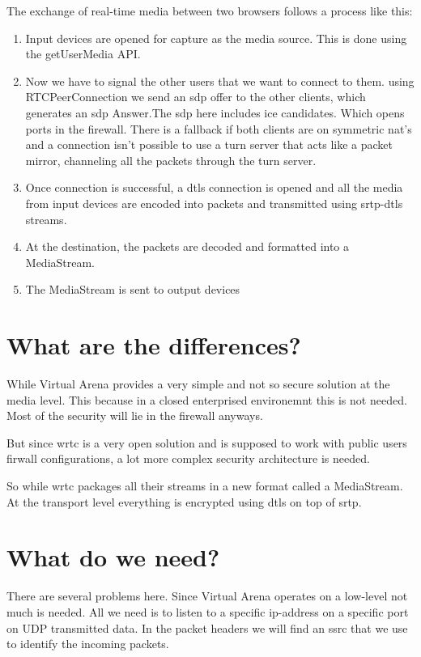The exchange of real-time media between two browsers follows a process like this:

\begin{enumerate}
\item Input devices are opened for capture as the media source. This is done using the getUserMedia API.
\item Now we have to signal the other users that we want to connect to them. using RTCPeerConnection we send an \gls{sdp} offer to the other clients, which generates an \gls{sdp} Answer.The \gls{sdp} here includes \gls{ice} candidates. Which opens ports in the firewall. There is a fallback if both clients are on symmetric \gls{nat}'s and a connection isn't possible to use a \gls{turn} server that acts like a packet mirror, channeling all the packets through the \gls{turn} server.
\item Once connection is successful, a \gls{dtls} connection is opened and all the media from input devices are encoded into packets and transmitted using \gls{srtp}-\gls{dtls} streams.
\item At the destination, the packets are decoded and formatted into a MediaStream.
\item The MediaStream is sent to output devices
\end{enumerate}

\section{What are the differences?}
While Virtual Arena provides a very simple and not so secure solution at the media level. This because in a closed enterprised environemnt this is not needed. Most of the security will lie in the firewall anyways.

But since \gls{wrtc} is a very open solution and is supposed to work with public users firwall configurations, a lot more complex security architecture is needed.

So while \gls{wrtc} packages all their streams in a new format called a MediaStream. At the transport level everything is encrypted using \gls{dtls} on top of \gls{srtp}.

\section{What do we need?}
There are several problems here. Since Virtual Arena operates on a low-level not much is needed. All we need is to listen to a specific ip-address on a specific port on UDP transmitted data. In the packet headers we will find an \gls{ssrc} that we use to identify the incoming packets.

